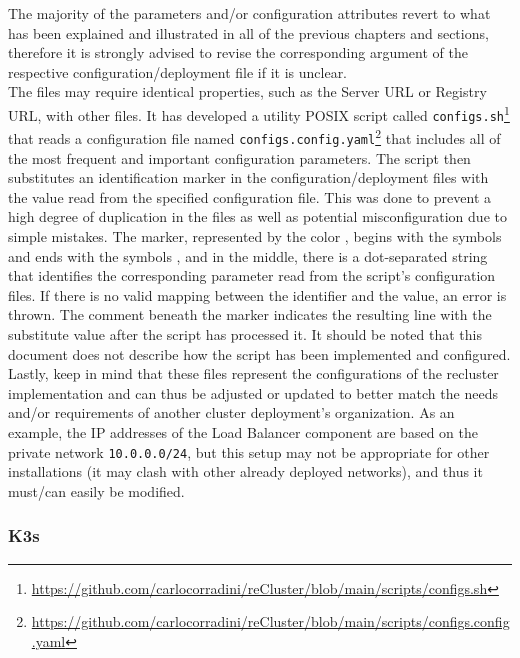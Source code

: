 The majority of the parameters and/or configuration attributes revert to what has
been explained and illustrated in all of the previous chapters and sections,
therefore it is strongly advised to revise the corresponding argument of the
respective configuration/deployment file if it is unclear. \\ %
The files may require identical properties, such as the Server URL or Registry URL,
with other files. It has developed a utility POSIX script called \texttt{configs.sh}\footnote{\url{https://github.com/carlocorradini/reCluster/blob/main/scripts/configs.sh}}
that reads a configuration file named \texttt{configs.config.yaml}\footnote{\url{https://github.com/carlocorradini/reCluster/blob/main/scripts/configs.config.yaml}}
that includes all of the most frequent and important configuration parameters.
The script then substitutes an identification marker in the configuration/deployment
files with the value read from the specified configuration file. This was done to
prevent a high degree of duplication in the files as well as potential misconfiguration
due to simple mistakes. The marker, represented by the color ,
begins with the symbols 
and ends with the symbols ,
and in the middle, there is a dot-separated string that identifies the
corresponding parameter read from the script's configuration files. If there is no
valid mapping between the identifier and the value, an error is thrown. The comment
beneath the marker indicates the resulting line with the substitute value after the
script has processed it. It should be noted that this document does not describe
how the script has been implemented and configured. \\ %
Lastly, keep in mind that these files represent the configurations of the recluster
implementation and can thus be adjusted or updated to better match the needs and/or
requirements of another cluster deployment's organization. As an example, the IP
addresses of the Load Balancer component are based on the private network \texttt{10.0.0.0/24},
but this setup may not be appropriate for other installations (it may clash with
other already deployed networks), and thus it must/can easily be modified.

\subsubsection{K3s}
\label{subsubsec:implementation_installer_configuration_files_k3s}

